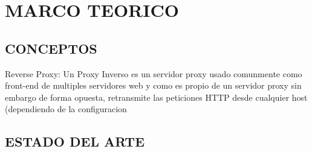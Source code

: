 \section{MARCO TEORICO}

\subsection{CONCEPTOS}
Reverse Proxy:
Un Proxy Inverso es un servidor proxy usado comunmente como front-end de multiples servidores web
y como es propio de un servidor proxy sin embargo de forma opuesta, retransmite las peticiones HTTP
desde cualquier host (dependiendo de la configuracion

\subsection{ESTADO DEL ARTE}